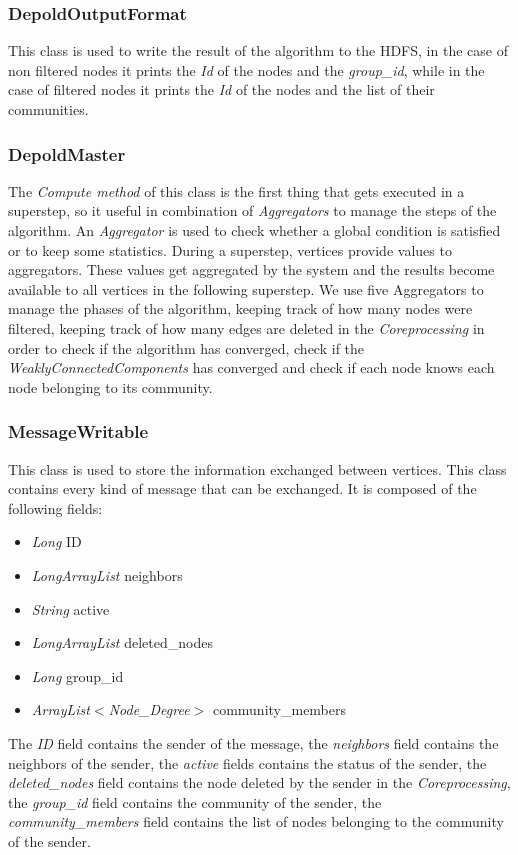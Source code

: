 \documentclass[12pt]{article}
\begin{document}
\subsubsection{DepoldOutputFormat}
This class is used to write the result of the algorithm to the HDFS, in the case of non filtered nodes it prints the \emph{Id} of the nodes and the \emph{group\_id}, while in the case of filtered nodes it prints the \emph{Id} of the nodes and the list of their communities.
\subsubsection{DepoldMaster}
The \emph{Compute method} of this class is the first thing that gets executed in a superstep, so it useful in combination of \emph{Aggregators} to manage the steps of the algorithm. An \emph{Aggregator} is used to check whether a global condition is satisfied or to keep some statistics. During a superstep, vertices provide values to aggregators. These values get aggregated by the system and the results become available to all vertices in the following superstep. We use five Aggregators to manage the phases of the algorithm, keeping track of how many nodes were filtered, keeping track of how many edges are deleted in the \emph{Coreprocessing} in order to check if the algorithm has converged, check if the \emph{WeaklyConnectedComponents} has converged and check if each node knows each node belonging to its community.
\subsubsection{MessageWritable}
This class is used to store the information exchanged between vertices. This class contains every kind of message that can be exchanged.
It is composed of the following fields:
\begin{itemize}
    \item \emph{Long} ID
    \item \emph{LongArrayList} neighbors
    \item \emph{String} active
    \item \emph{LongArrayList} deleted\_nodes
    \item \emph{Long} group\_id
    \item \emph{ArrayList$<$Node\_Degree$>$} community\_members
\end{itemize}
    The \emph{ID} field contains the sender of the message, the \emph{neighbors} field contains the neighbors of the sender, the \emph{active} fields contains the status of the sender, the \emph{deleted\_nodes} field contains the node deleted by the sender in the \emph{Coreprocessing},
    the \emph{group\_id} field contains the community of the sender, the \emph{community\_members} field contains the list of nodes belonging to the community of the sender.
\end{document}
